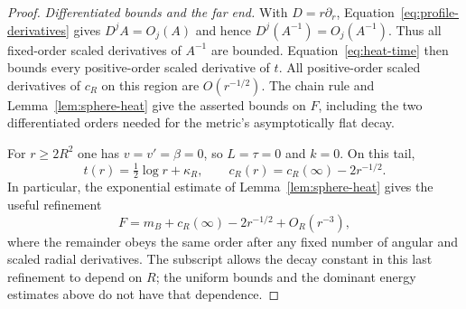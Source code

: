 \begin{proof}
\emph{Differentiated bounds and the far end.}
With $D=r\partial_r$, Equation~\eqref{eq:profile-derivatives}
gives $D^jA=O_j(A)$ and hence $D^j(A^{-1})=O_j(A^{-1})$.
Thus all fixed-order scaled derivatives of $A^{-1}$ are bounded.
Equation~\eqref{eq:heat-time}
then bounds every positive-order scaled derivative of $t$.
All positive-order scaled derivatives of $c_R$ on this region
are $O(r^{-1/2})$. The chain rule and
Lemma~\ref{lem:sphere-heat} give the asserted bounds on $F$,
including the two differentiated orders needed for the metric's
asymptotically flat decay.

For $r\geq2R^2$ one has $v=v'=\beta=0$, so $L=\tau=0$ and
$k=0$. On this tail,
\[
 t(r)=\tfrac12\log r+\kappa_R,\qquad
 c_R(r)=c_R(\infty)-2r^{-1/2}.
\]
In particular, the exponential estimate of
Lemma~\ref{lem:sphere-heat} gives the useful refinement
\begin{equation}\label{eq:tail-profile}
 F=m_B+c_R(\infty)-2r^{-1/2}+O_R(r^{-3}),
\end{equation}
where the remainder obeys the same order after any fixed number
of angular and scaled radial derivatives. The subscript allows
the decay constant in this last refinement to depend on $R$;
the uniform bounds and the dominant energy estimates above do
not have that dependence.
\end{proof}

